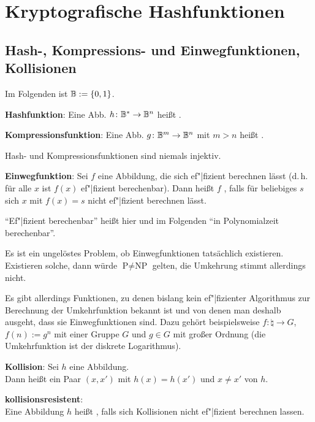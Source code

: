 \section{%
    Kryptografische Hashfunktionen%
}

\subsection{%
    Hash-, Kompressions- und Einwegfunktionen, Kollisionen%
}

Im Folgenden ist $\mathbb{B} := \{0, 1\}$.

\textbf{Hashfunktion}:
Eine Abb. $h\colon \mathbb{B}^\ast \to \mathbb{B}^n$ heißt .

\textbf{Kompressionsfunktion}:
Eine Abb. $g\colon \mathbb{B}^m \to \mathbb{B}^n$ mit $m > n$ heißt .

Hash- und Kompressionsfunktionen sind niemals injektiv.

\linie

\textbf{Einwegfunktion}:
Sei $f$ eine Abbildung, die sich ef"|fizient berechnen lässt
(d.\,h. für alle $x$ ist $f(x)$ ef"|fizient berechenbar).
Dann heißt $f$ , falls für beliebiges $s$ sich $x$ mit $f(x) = s$
nicht ef"|fizient berechnen lässt.

"`Ef"|fizient berechenbar"' heißt hier und im Folgenden "`in Polynomialzeit berechenbar"'.

Es ist ein ungelöstes Problem, ob Einwegfunktionen tatsächlich existieren.
Existieren solche, dann würde $\text{P} \not= \text{NP}$ gelten,
die Umkehrung stimmt allerdings nicht.

Es gibt allerdings Funktionen, zu denen bislang kein ef"|fizienter Algorithmus zur Berechnung der
Umkehrfunktion bekannt ist und von denen man deshalb ausgeht, dass sie Einwegfunktionen sind.
Dazu gehört beispielsweise $f\colon \natural \to G$, $f(n) := g^n$ mit einer Gruppe $G$
und $g \in G$ mit großer Ordnung (die Umkehrfunktion ist der diskrete Logarithmus).

\linie

\textbf{Kollision}:
Sei $h$ eine Abbildung.\\
Dann heißt ein Paar $(x, x')$ mit $h(x) = h(x')$ und $x \not= x'$
 von $h$.

\textbf{kollisionsresistent}:\\
Eine Abbildung $h$ heißt , falls sich Kollisionen nicht ef"|fizient
berechnen lassen.

